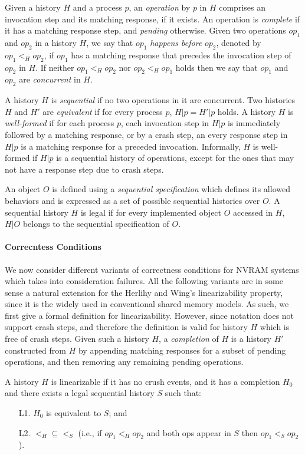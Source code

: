 Given a history $H$ and a process $p$, an \textit{operation} by $p$ in $H$ comprises an invocation step and its matching response, if it exists. An operation is \textit{complete} if it has a matching response step, and \textit{pending} otherwise. Given two operations $op_1$ and $op_2$ in a history $H$, we say that $op_1$ \textit{happens before} $op_2$, denoted by $op_1 <_H op_2$, if $op_1$ has a matching
response that precedes the invocation step of $op_2$ in $H$. If neither $op_1 <_H op_2$ nor $op_2 <_H op_1$ holds then we say that $op_1$ and $op_2$ are \textit{concurrent} in $H$.

A history $H$ is \textit{sequential} if no two operations in it are concurrent. Two histories $H$ and $H'$ are \textit{equivalent} if for every process $p$, $H|p = H'|p$ holds. A history $H$ is \textit{well-formed} if for each process $p$, each invocation step in $H|p$ is immediately followed by a matching response, or by a crash step, an every response step in $H|p$ is a matching response for a preceded invocation. Informally, $H$ is well-formed if $H|p$ is a sequential history of operations, except for the ones that may not have a response step due to crash steps.

An object $O$ is defined using a \textit{sequential specification} which defines its allowed behaviors and is expressed as a set of possible sequential histories over $O$. A sequential history $H$ is legal if for every implemented object $O$ accessed in $H$, $H|O$ belongs to the sequential specification of $O$.


\paragraph{Correcntess Conditions}
We now consider different variants of correctness conditions for NVRAM systems which takes into consideration failures. All the following variants are in some sense a natural extension for the Herlihy and Wing's linearizability property, since it is the widely used in conventional shared memory models. As such, we first give a formal definition for linearizability. However, since notation does not support crash steps, and therefore the definition is valid for history $H$ which is free of crash steps. Given such a history $H$, a \textit{completion} of $H$ is a history $H'$ constructed from $H$ by appending matching responses for a subset of pending operations, and then removing any remaining pending operations.

\begin{definition}[Linearizability]
	A history $H$ is linearizable if it has no crush events, and it has a completion $H_0$ and there exists a legal sequential history $S$ such that:
	\begin{enumerate}
		\item [L1.] $H_0$ is equivalent to $S$; and
		\item [L2.] $<_H \subseteq <_S$ (i.e., if $op_1 <_H op_2$ and both ops appear in $S$ then $op_1 <_S op_2$).
	\end{enumerate}
\end{definition}


